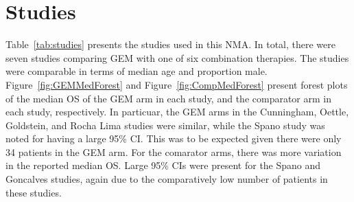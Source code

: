 \chapter{Studies}

Table~\ref{tab:studies} presents the studies used in this NMA. In total, there were seven studies comparing GEM with one of six combination therapies. The studies were comparable in terms of median age and proportion male. \\

Figure~\ref{fig:GEMMedForest} and Figure~\ref{fig:CompMedForest} present forest plots of the median OS of the GEM arm in each study, and the comparator arm in each study, respectively. In particuar, the GEM arms in the Cunningham, Oettle, Goldstein, and Rocha Lima studies were similar, while the Spano study was noted for having a large 95\% CI. This was to be expected given there were only 34 patients in the GEM arm. For the comarator arms, there was more variation in the reported median OS. Large 95\% CIs were present for the Spano and Goncalves studies, again due to the comparatively low number of patients in these studies. 

